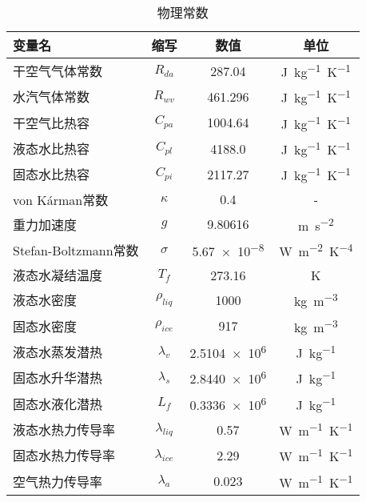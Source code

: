 \begin{table}[]
\centering
\caption{物理常数}
\label{tab:物理常数chap4}
\begin{tabular}{lccc}
\toprule
变量名&缩写&数值&单位 \\\midrule
干空气气体常数            & $R_{da}$                      & \num{287.04}     & \unit{J.kg^{-1}.K^{-1}}  \\ 
水汽气体常数             & $R_{wv}$                       & \num{461.296}     & \unit{J.kg^{-1}.K^{-1}}  \\
干空气比热容             & $C_{pa} $                      & \num{1004.64}    & \unit{J.kg^{-1}.K^{-1}}  \\
液态水比热容             & $C_{pl}$                       & \num{4188.0}     & \unit{J.kg^{-1}.K^{-1}}  \\
固态水比热容             & $C_{pi}$                       & \num{2117.27}    & \unit{J.kg^{-1}.K^{-1}}  \\
von K\'arman常数       & $\kappa$                        & \num{0.4}        &    -     \\
重力加速度              & $g$                             & \num{9.80616}    & \unit{m.s^{-2}}    \\
Stefan-Boltzmann常数 & $\sigma$                          & \num{5.67e-8}    & \unit{W.m^{-2}.K^{-4}} \\
液态水凝结温度            & $T_f$                         & \num{273.16}     & K       \\
液态水密度              & $\rho_{liq}$                   & \num{1000}        & \unit{kg.m^{-3}}   \\
固态水密度              & $\rho_{ice}$                   & \num{917}         & \unit{kg.m^{-3}}   \\
液态水蒸发潜热            & $\lambda_v$                  & \num{2.5104e6}    & \unit{J.kg^{-1}}    \\
固态水升华潜热            & $\lambda_s$                  & \num{2.8440e6}    & \unit{J.kg^{-1}}    \\
固态水液化潜热            & $L_f$                        & \num{0.3336e6}    & \unit{J.kg^{-1}}    \\
液态水热力传导率           & $\lambda_{liq}$             & \num{0.57}         & \unit{W.m^{-1}.K^{-1}}   \\
固态水热力传导率           & $\lambda_{ice}$             & \num{2.29}         & \unit{W.m^{-1}.K^{-1}}   \\
空气热力传导率            & $\lambda_a$                 & \num{0.023}         & \unit{W.m^{-1}.K^{-1}}      \\\bottomrule
\end{tabular}
\end{table}



